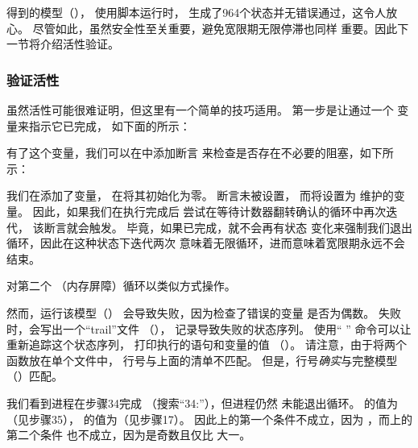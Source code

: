 得到的模型（），
使用脚本运行时，
生成了964个状态并无错误通过，这令人放心。
尽管如此，虽然安全性至关重要，避免宽限期无限停滞也同样
重要。因此下一节将介绍活性验证。

\subsubsection{验证活性}
\label{sec:formal:Validating Liveness}

\begin{fcvref}
虽然活性可能很难证明，但这里有一个简单的技巧适用。
第一步是让通过一个
变量来指示它已完成，
如下面的所示：
\end{fcvref}



有了这个变量，我们可以在中添加断言
来检查是否存在不必要的阻塞，如下所示：



\begin{fcvref}
我们在添加了变量，
在将其初始化为零。
断言未被设置，
而将设置为
维护的变量。
因此，如果我们在执行完成后
尝试在等待计数器翻转确认的循环中再次迭代，
该断言就会触发。
毕竟，如果已完成，就不会再有状态
变化来强制我们退出循环，因此在这种状态下迭代两次
意味着无限循环，进而意味着宽限期永远不会结束。

对第二个
（内存屏障）循环以类似方式操作。

然而，运行该模型（）
会导致失败，因为检查了错误的变量
是否为偶数。
失败时，会写出一个``trail''文件
（），
记录导致失败的状态序列。
使用``%
''
命令可以让重新追踪这个状态序列，
打印执行的语句和变量的值
（）。
请注意，由于将两个函数放在单个文件中，
行号与上面的清单不匹配。
但是，行号\emph{确实}与完整模型
（）匹配。

我们看到进程在步骤34完成
（搜索``34:''），但进程仍然
未能退出循环。
的值为（见步骤35），
的值为（见步骤17）。
因此上的第一个条件不成立，因为
，而上的第二个条件
也不成立，因为是奇数且仅比
大一。
\end{fcvref}

